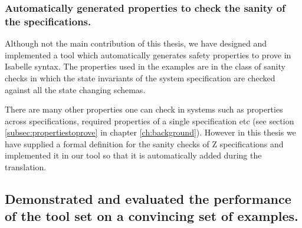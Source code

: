 %

\subsubsection{Automatically generated properties to check the sanity of the specifications.}

Although not the main contribution of this thesis, we have designed and
implemented a tool which automatically generates safety properties to prove in
Isabelle syntax. The properties used in the examples are in the class of sanity
checks in which the state invariants of the system specification are checked
against all the state changing schemas.

There are many other properties one can check in systems such as properties
across specifications, required properties of a single specification etc (see
section \ref{subsec:propertiestoprove} in chapter \ref{ch:background}).
However in this thesis we have supplied a formal definition for the sanity
checks of Z specifications and implemented it in our tool so that it is
automatically added during the translation.


\subsection{Demonstrated and evaluated the performance of the tool set on a convincing set of examples.}

